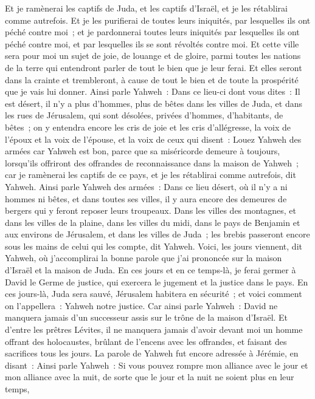 \begin{multicols}{2}
Et je ramènerai les captifs de Juda, et les captifs d'Israël, et je les rétablirai comme autrefois.
Et je les purifierai de toutes leurs iniquités, par lesquelles ils ont péché contre moi~; et je pardonnerai toutes leurs iniquités par lesquelles ils ont péché contre moi, et par lesquelles ils se sont révoltés contre moi.
Et cette ville sera pour moi un sujet de joie, de louange et de gloire, parmi toutes les nations de la terre qui entendront parler de tout le bien que je leur ferai. Et elles seront dans la crainte et trembleront, à cause de tout le bien et de toute la prospérité que je vais lui donner.
Ainsi parle Yahweh~: Dans ce lieu-ci dont vous dites~: Il est désert, il n'y a plus d'hommes, plus de bêtes dans les villes de Juda, et dans les rues de Jérusalem, qui sont désolées, privées d'hommes, d'habitants, de bêtes~;
on y entendra encore les cris de joie et les cris d'allégresse, la voix de l'époux et la voix de l'épouse, et la voix de ceux qui disent~: Louez Yahweh des armées car Yahweh est bon, parce que sa miséricorde demeure à toujours, lorsqu'ils offriront des offrandes de reconnaissance dans la maison de Yahweh~; car je ramènerai les captifs de ce pays, et je les rétablirai comme autrefois, dit Yahweh.
Ainsi parle Yahweh des armées~: Dans ce lieu désert, où il n'y a ni hommes ni bêtes, et dans toutes ses villes, il y aura encore des demeures de bergers qui y feront reposer leurs troupeaux.
Dans les villes des montagnes, et dans les villes de la plaine, dans les villes du midi, dans le pays de Benjamin et aux environs de Jérusalem, et dans les villes de Juda~; les brebis passeront encore sous les mains de celui qui les compte, dit Yahweh.
Voici, les jours viennent, dit Yahweh, où j'accomplirai la bonne parole que j'ai prononcée sur la maison d'Israël et la maison de Juda.
En ces jours et en ce temps-là, je ferai germer à David le Germe de justice, qui exercera le jugement et la justice dans le pays.
En ces jours-là, Juda sera sauvé, Jérusalem habitera en sécurité~; et voici comment on l'appellera~: Yahweh notre justice.
Car ainsi parle Yahweh~: David ne manquera jamais d'un successeur assis sur le trône de la maison d'Israël.
Et d'entre les prêtres Lévites, il ne manquera jamais d'avoir devant moi un homme offrant des holocaustes, brûlant de l'encens avec les offrandes, et faisant des sacrifices tous les jours.
La parole de Yahweh fut encore adressée à Jérémie, en disant~:
Ainsi parle Yahweh~: Si vous pouvez rompre mon alliance avec le jour et mon alliance avec la nuit, de sorte que le jour et la nuit ne soient plus en leur temps,

\end{multicols}
